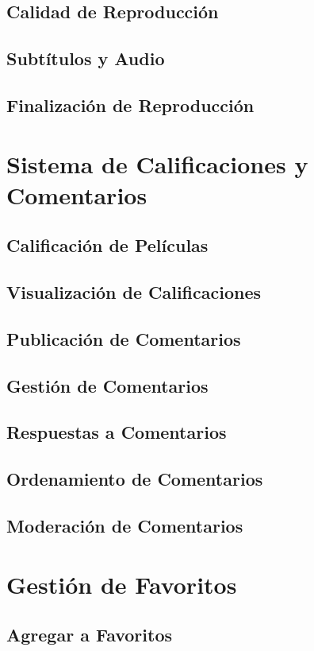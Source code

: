 \documentclass[11pt,a4paper,twoside]{book}
\begin{document}
\section{Calidad de Reproducción}
\section{Subtítulos y Audio}
\section{Finalización de Reproducción}

\chapter{Sistema de Calificaciones y Comentarios}
\section{Calificación de Películas}
\section{Visualización de Calificaciones}
\section{Publicación de Comentarios}
\section{Gestión de Comentarios}
\section{Respuestas a Comentarios}
\section{Ordenamiento de Comentarios}
\section{Moderación de Comentarios}

\chapter{Gestión de Favoritos}
\section{Agregar a Favoritos}
\end{document}
